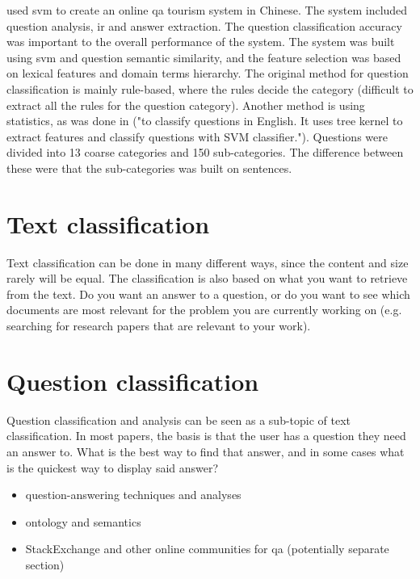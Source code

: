 \citet{XuZhouWang2012} used \gls{svm} to create an online \gls{qa} tourism system in Chinese. The 
system included question analysis, \gls{ir} and answer extraction. The question classification 
accuracy was important to the overall performance of the system. The system was built using 
\gls{svm} and question semantic similarity, and the feature selection was based on lexical features 
and domain terms hierarchy. The original method for question classification is mainly rule-based, 
where the rules decide the category (difficult to extract all the rules for the question category). 
Another method is using statistics, as was done in \cite{ZhangLee2003} ("to classify questions in English. It uses tree kernel to extract features and classify questions with SVM classifier."). 
Questions were divided into 13 coarse categories and 150 sub-categories. The difference between 
these were that the sub-categories was built on sentences.



\section{Text classification}
\label{sec:text_classification}
Text classification can be done in many different ways, since the content and size rarely will be 
equal. The classification is also based on what you want to retrieve from the text. Do you want 
an answer to a question, or do you want to see which documents are most relevant for the problem 
you are currently working on (e.g. searching for research papers that are relevant to your work).

\section{Question classification}
\label{sec:question_answering}
Question classification and analysis can be seen as a sub-topic of text classification. In most 
papers, the basis is that the user has a question they need an answer to. What is the best way 
to find that answer, and in some cases what is the quickest way to display said answer?
 
\begin{itemize}
	\item question-answering techniques and analyses
	\item ontology and semantics
	\item StackExchange and other online communities for qa (potentially separate section)
\end{itemize}


